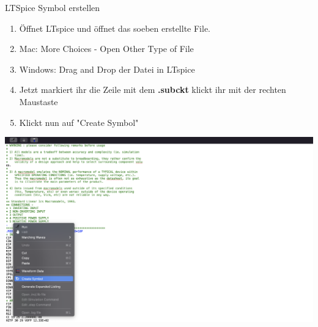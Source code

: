 \begin{frame}[t]{LTSpice Symbol erstellen}

    \begin{enumerate}
        \item Öffnet LTspice und öffnet das soeben erstellte File.
        \item Mac: More Choices -\> Open Other Type of File
        \item Windows: Drag and Drop der Datei in LTspice
        \item Jetzt markiert ihr die Zeile mit dem \textbf{.subckt} klickt ihr mit der rechten Maustaste
        \item Klickt nun auf "Create Symbol"
    \end{enumerate}


    \begin{spacing}{0.9} \begin{tiny}
            \begin{minipage}{\textwidth}
                \includegraphics[width=0.6\linewidth]{pictures/ModelCreation.png}
            \end{minipage}
        \end{tiny} \end{spacing}

\end{frame}


